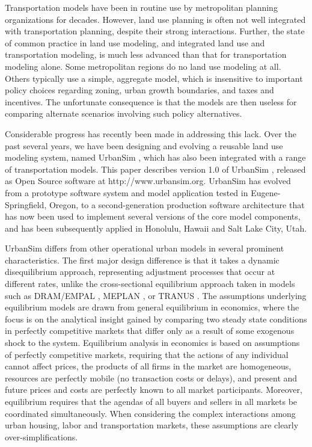 \documentclass[fleqn]{article}
\begin{document}
Transportation models have been in routine use by metropolitan
planning organizations for decades.  However, land use planning is
often not well integrated with transportation planning, despite
their strong interactions. Further, the state of common practice
in land use modeling, and integrated land use and transportation
modeling, is much less advanced than that for transportation
modeling alone.  Some metropolitan regions do no land use modeling
at all.  Others typically use a simple, aggregate model, which is
insensitive to important policy choices regarding zoning, urban
growth boundaries, and taxes and incentives.  The unfortunate
consequence is that the models are then useless for comparing
alternate scenarios involving such policy alternatives.

Considerable progress has recently been made in addressing this
lack.  Over the past several years, we have been designing and
evolving a reusable land use modeling system, named UrbanSim
\cite{noth-architecture-2000,waddell-asce-1998,waddell-env-and-planning-2000},
which has also been integrated with a range of transportation
models. This paper describes version 1.0 of UrbanSim
\cite{urbansim-reference-2000}, released as
Open Source software at {\sf http://www.urbansim.org}. UrbanSim has
evolved from a prototype software system and model application
tested in Eugene-Springfield, Oregon, to a second-generation
production software architecture that has now been used to
implement several versions of the core model components, and has
been subsequently applied in Honolulu, Hawaii and Salt Lake City,
Utah.


UrbanSim differs from other operational urban models in several
prominent characteristics.  The first major design difference is
that it takes a dynamic disequilibrium approach, representing
adjustment processes that occur at different rates, unlike the
cross-sectional equilibrium approach taken in models such as
DRAM/EMPAL \cite{putman-book-1983}, MEPLAN
\cite{echenique-transport-reviews-1990}, or TRANUS
\cite{delabarra-book-1995}. The assumptions underlying equilibrium
models are drawn from general equilibrium in economics, where the
focus is on the analytical insight gained by comparing two steady
state conditions in perfectly competitive markets that differ only
as a result of some exogenous shock to the system.  Equilibrium
analysis in economics is based on assumptions of perfectly
competitive markets, requiring that the actions of any individual
cannot affect prices, the products of all firms in the market are
homogeneous, resources are perfectly mobile (no transaction costs
or delays), and present and future prices and costs are perfectly
known to all market participants.  Moreover, equilibrium requires
that the agendas of all buyers and sellers in all markets be
coordinated simultaneously. When considering the complex
interactions among urban housing, labor and transportation
markets, these assumptions are clearly over-simplifications.
\end{document}
